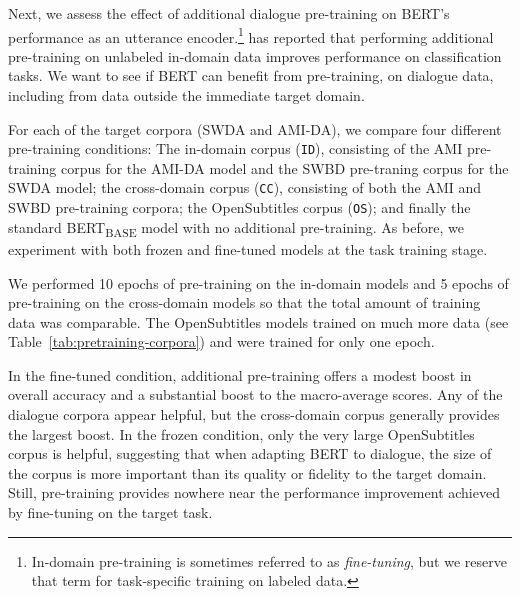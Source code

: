\documentclass[11pt,a4paper]{article}
\begin{document}
Next, we assess the effect of additional dialogue pre-training on BERT's performance as an utterance encoder.\footnote{
In-domain pre-training is sometimes referred to as \textit{fine-tuning}, but we reserve that term for task-specific training on labeled data.}
\citet{sunHowFineTuneBERT2019} has reported that performing additional pre-training on unlabeled in-domain data improves performance on classification tasks. 
We want to see if BERT can benefit from pre-training, on dialogue data, including from data outside the immediate target domain.

For each of the target corpora (SWDA and AMI-DA), we compare four different pre-training conditions: 
The in-domain corpus (\texttt{ID}), consisting of the AMI pre-training corpus for the AMI-DA model and the SWBD pre-traning corpus for the SWDA model; 
the cross-domain corpus (\texttt{CC}), consisting of both the AMI and SWBD pre-training corpora; 
the OpenSubtitles corpus (\texttt{OS});
and finally the standard BERT\textsubscript{BASE} model with no additional pre-training.
As before, we experiment with both frozen and fine-tuned models at the task training stage.

We performed 10 epochs of pre-training on the in-domain models and 5 epochs of pre-training on the cross-domain models so that the total amount of training data was comparable. The OpenSubtitles models trained on much more data (see Table~\ref{tab:pretraining-corpora}) and were trained for only one epoch.

In the fine-tuned condition, additional pre-training offers a modest boost in overall accuracy and a substantial boost to the macro-average scores.
Any of the dialogue corpora appear helpful, but the cross-domain corpus generally provides the largest boost.
In the frozen condition, only the very large OpenSubtitles corpus is helpful, suggesting that when adapting BERT to dialogue, the size of the corpus is more important than its quality or fidelity to the target domain.
Still, pre-training provides nowhere near the performance improvement achieved by fine-tuning on the target task.
\end{document}
